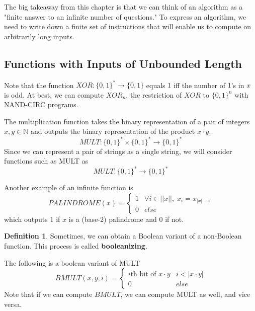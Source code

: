 \documentclass[a4paper, 12pt]{report}
\theoremstyle{remark}
\theoremstyle{definition}
\newtheorem{definition}{Definition}[section]
\begin{document}
The big takeaway from this chapter is that we can think of an algorithm as a "finite answer to an infinite number of questions." To express an algorithm, we need to write down a finite set of instructions that will enable us to compute on arbitrarily long inputs. 

\subsection{Functions with Inputs of Unbounded Length}
\begin{example}
Note that the function $XOR: \{0,1\}^* \longrightarrow \{0,1\}$ equals $1$ iff the number of $1$'s in $x$ is odd. At best, we can compute $XOR_n$, the restriction of $XOR$ to $\{0,1\}^n$ with NAND-CIRC programs. 
\end{example}

\begin{example}
The multiplication function takes the binary representation of a pair of integers $x, y \in \mathbb{N}$ and outputs the binary representation of the product $x \cdot y$. 
\[MULT: \{0,1\}^* \times \{0,1\}^* \longrightarrow \{0,1\}^*\]
Since we can represent a pair of strings as a single string, we will consider functions such as MULT as
\[MULT: \{0,1\}^* \longrightarrow \{0,1\}^*\]
\end{example}

\begin{example}
Another example of an infinite function is 
\[PALINDROME (x) = \begin{cases}
1 & \forall i \in ||x||, \; x_i = x_{|x|-i} \\
0 & else
\end{cases}\]
which outputs $1$ if $x$ is a (base-2) palindrome and $0$ if not. 
\end{example}

\begin{definition}
Sometimes, we can obtain a Boolean variant of a non-Boolean function. This process is called \textbf{booleanizing}. 
\end{definition}

\begin{example}
The following is a boolean variant of MULT
\[BMULT(x, y, i) = \begin{cases}
i\text{th bit of } x\cdot y & i < |x \cdot y|\\
0 & else
\end{cases}\]
Note that if we can compute $BMULT$, we can compute MULT as well, and vice versa. 
\end{example}
\end{document}

